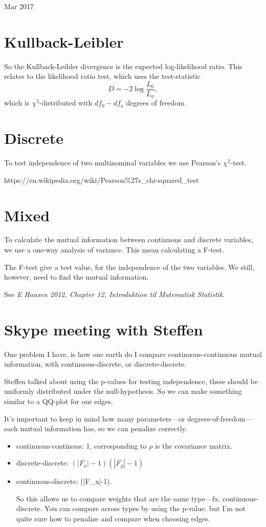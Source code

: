 \documentclass[12pt]{article}
\begin{document}
{\Large Mar 2017}
\section{Kullback-Leibler}
So the Kullback-Leibler divergence is the expected log-likelihood ratio.
This relates to the likelihood ratio test, which uses the test-statistic
$$ D = - 2 \log \frac{L_0}{L_a},$$
which is $\chi^2$-distributed with $df_0 - df_a$ degrees of freedom.

\section{Discrete}
To test independence of two multinominal variables we use Pearson's $\chi^2$-test. 

https://en.wikipedia.org/wiki/Pearson\%27s\_chi-squared\_test

\section{Mixed}
To calculate the mutual information between continuous and discrete variables, we use a one-way analysis of variance. This mean calculating a F-test. 

The F-test give a test value, for the independence of the two variables. We still, however, need to find the mutual information.

See \emph{E Hansen 2012, Chapter 12, Introduktion til Matematisk Statistik}.

\section{Skype meeting with Steffen}
One problem I have, is how one earth do I compare continuous-continuous
mutual information, with continuous-discrete, or discrete-discrete.

Steffen talked about using the p-values for testing independence, these should be uniformly distributed under the null-hypothesis. So we can make something similar to a QQ-plot for our edges.

It's important to keep in mind how many parameters---or degrees-of-freedom--- each mutual information has, so we can penalize correctly. 
\begin{itemize}
\item continuous-continous: 1, corresponding to $\rho$ is the covariance matrix.
\item discrete-discrete: $(|F_x|-1)(|F_y|-1)$
\item continuous-discrete: (|F_x|-1).

So this allows us to compare weights that are the same type---fx. continuous-discrete. You can compare across types by using the p-value, but I'm not quite sure how to penalize and compare when choosing edges.
\end{itemize}
\end{document}
